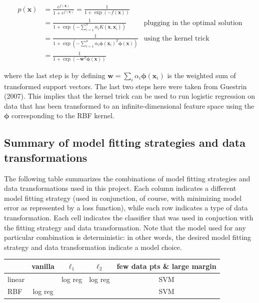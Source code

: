 \documentclass[letterpaper, 11pt]{article}
\newcommand{\vect}[1]{\boldsymbol{#1}}
\begin{document}
\begin{align*}
  p(\vect{x}) & = \frac{e^{f(\vect{x})}}{1 + e^{f(\vect{x})}} = \frac{1}{1 + \exp({-f(\vect{x})})} & \\
  & = \frac{1}{1 + \exp(-\sum_{i=1}^{n} \alpha_i K(\vect{x}, \vect{x}_i^\prime))} & \text{plugging in the optimal solution} \\
  & = \frac{1}{1 + \exp(-\sum_{i=1}^{n} \alpha_i \vect{\phi}(\vect{x}_i)^T \vect{\phi}(\vect{x}))} & \text{using the kernel trick} \\
  & = \frac{1}{1 + \exp(-\vect{w}^T \vect{\phi}(\vect{x}))} &
\end{align*}

where the last step is by defining $\vect{w} = \sum_{i} \alpha_i \vect{\phi}(\vect{x}_i)$ is the weighted sum of transformed support vectors. The last two steps here were taken from Guestrin (2007). This implies that the kernel trick can be used to run logistic regression on data that has been transformed to an infinite-dimensional feature space using the $\vect{\phi}$ corresponding to the RBF kernel.

\subsection{Summary of model fitting strategies and data transformations}

The following table summarizes the combinations of model fitting strategies and data transformations used in this project. Each column indicates a different model fitting strategy (used in conjunction, of course, with minimizing model error as represented by a loss function), while each row indicates a type of data transformation. Each cell indicates the classifier that was used in conjuction with the fitting strategy and data transformation. Note that the model used for any particular combination is deterministic: in other words, the desired model fitting strategy and data transformation indicate a model choice.

\begin{center}
  \begin{tabular}{l|c|c|c|c|}
         & vanilla & $\ell_1$ & $\ell_2$ & few data pts \& large margin \\
\hline
  linear &         & log reg  & log reg  & SVM \\
\hline
  RBF    & log reg &          &          & SVM \\
\hline
\end{tabular}
\end{center}
\end{document}
